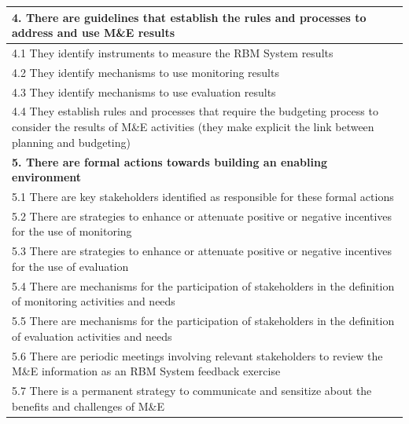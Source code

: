 \documentclass[
  10pt,
]{book}
\begin{document}
\begin{table}
\begin{tabular}[t]{l}
\hline
\multicolumn{1}{l}{\textbf{4. There are guidelines that establish the rules and processes to address and use M\&E results}}\\
\hline
\hspace{1em}4.1 They identify instruments to measure the RBM System results\\
\hline
\hspace{1em}4.2 They identify mechanisms to use monitoring results\\
\hline
\hspace{1em}4.3 They identify mechanisms to use evaluation results\\
\hline
\hspace{1em}4.4 They establish rules and processes that require the budgeting process to consider the results of M\&E activities (they make explicit the link between planning and budgeting)\\
\hline
\multicolumn{1}{l}{\textbf{5. There are formal actions towards building an enabling environment}}\\
\hline
\hspace{1em}\hspace{1em}5.1 There are key stakeholders identified as responsible for these formal actions\\
\hline
\hspace{1em}\hspace{1em}5.2 There are strategies to enhance or attenuate positive or negative incentives for the use of monitoring\\
\hline
\hspace{1em}5.3 There are strategies to enhance or attenuate positive or negative incentives for the use of evaluation\\
\hline
\hspace{1em}5.4 There are mechanisms for the participation of stakeholders in the definition of monitoring activities and needs\\
\hline
\hspace{1em}5.5 There are mechanisms for the participation of stakeholders in the definition of evaluation activities and needs\\
\hline
\hspace{1em}5.6 There are periodic meetings involving relevant stakeholders to review the M\&E information as an RBM System feedback exercise\\
\hline
\hspace{1em}5.7 There is a permanent strategy to communicate and sensitize about the benefits and challenges of M\&E\\

\end{tabular}
\end{table}
\end{document}
